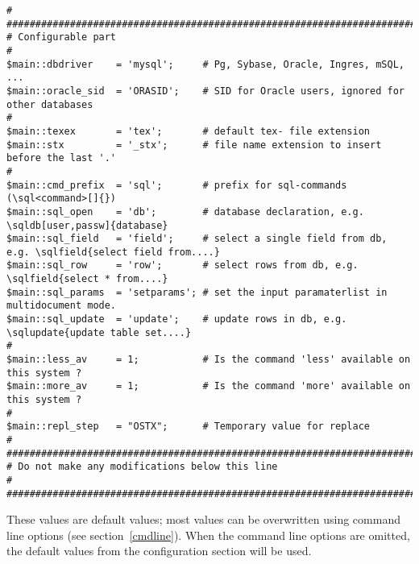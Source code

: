 \documentclass{article}
\newcommand{\vs}{\vspace{3mm}}
\begin{document}
{\scriptsize\begin{verbatim}
#
################################################################################
# Configurable part
#
$main::dbdriver    = 'mysql';     # Pg, Sybase, Oracle, Ingres, mSQL, ...
$main::oracle_sid  = 'ORASID';    # SID for Oracle users, ignored for other databases
#
$main::texex       = 'tex';       # default tex- file extension
$main::stx         = '_stx';      # file name extension to insert before the last '.'
#
$main::cmd_prefix  = 'sql';       # prefix for sql-commands (\sql<command>[]{})
$main::sql_open    = 'db';        # database declaration, e.g. \sqldb[user,passw]{database}
$main::sql_field   = 'field';     # select a single field from db, e.g. \sqlfield{select field from....}
$main::sql_row     = 'row';       # select rows from db, e.g. \sqlfield{select * from....}
$main::sql_params  = 'setparams'; # set the input paramaterlist in multidocument mode.
$main::sql_update  = 'update';    # update rows in db, e.g. \sqlupdate{update table set....}
#
$main::less_av     = 1;           # Is the command 'less' available on this system ?
$main::more_av     = 1;           # Is the command 'more' available on this system ?
#
$main::repl_step   = "OSTX";      # Temporary value for replace
#
################################################################################
# Do not make any modifications below this line                                #
################################################################################
\end{verbatim}}

\vs

These values are default values; most values can be overwritten using command line
options (see section~\ref{cmdline}). When the command line options are
omitted, the default values from the configuration section will be used.
\end{document}
